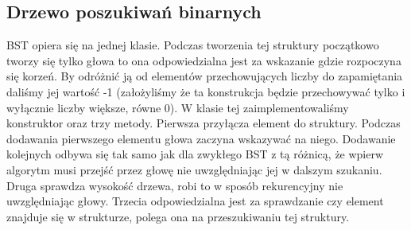 \documentclass[polish,polish,a4paper]{article}
\begin{document}
\begin{spacing}{1.5}
\subsection*{Drzewo poszukiwań binarnych}
BST opiera się na jednej klasie. Podczas tworzenia tej struktury początkowo tworzy się tylko głowa to ona odpowiedzialna jest za wskazanie gdzie rozpoczyna się korzeń. By odróżnić ją od elementów przechowujących liczby do zapamiętania daliśmy jej wartość -1 (założyliśmy że ta konstrukcja będzie przechowywać tylko i wyłącznie liczby większe, równe 0). W klasie tej zaimplementowaliśmy konstruktor oraz trzy metody. Pierwsza przyłącza element do struktury. Podczas dodawania pierwszego elementu głowa zaczyna wskazywać na niego. Dodawanie kolejnych odbywa się tak samo jak dla zwykłego  BST z tą różnicą, że wpierw algorytm musi przejść przez głowę nie uwzględniając jej w dalszym szukaniu. Druga sprawdza wysokość drzewa, robi to w sposób rekurencyjny nie uwzględniając głowy. Trzecia odpowiedzialna jest za sprawdzanie czy element znajduje się w strukturze, polega ona na przeszukiwaniu tej struktury.


\end{spacing}
\end{document}
